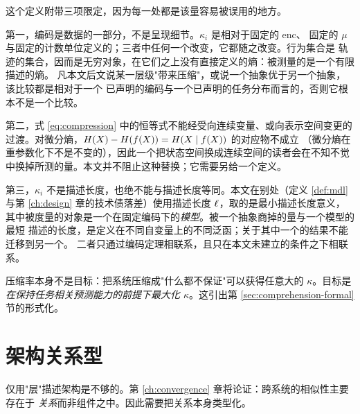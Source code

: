 这个定义附带三项限定，因为每一处都是该量容易被误用的地方。

第一，编码是数据的一部分，不是呈现细节。$\kappa_i$ 是相对于固定的 $\mathrm{enc}$、
固定的 $\mu$ 与固定的计数单位定义的；三者中任何一个改变，它都随之改变。行为集合是
轨迹的集合，因而是无穷对象，在它们之上没有直接定义的熵：被测量的是一个有限描述的熵。
凡本文后文说某一层级"带来压缩"，或说一个抽象优于另一个抽象，该比较都是相对于一个
已声明的编码与一个已声明的任务分布而言的，否则它根本不是一个比较。

第二，式 \eqref{eq:compression} 中的恒等式不能经受向连续变量、或向表示空间变更的
过渡。对微分熵，$H(X)-H(f(X)) = H(X \mid f(X))$ 的对应物不成立
（微分熵在重参数化下不是不变的），因此一个把状态空间换成连续空间的读者会在不知不觉
中换掉所测的量。本文并不阻止这种替换；它需要另给一个定义。

第三，$\kappa_i$ 不是描述长度，也绝不能与描述长度等同。本文在别处（定义 \ref{def:mdl}
与第 \ref{ch:design} 章的技术债落差）使用描述长度 $\ell$，取的是最小描述长度意义，
其中被度量的对象是一个在固定编码下的\emph{模型}。被一个抽象商掉的量与一个模型的最短
描述的长度，是定义在不同自变量上的不同泛函；关于其中一个的结果不能迁移到另一个。
二者只通过编码定理相联系，且只在本文未建立的条件之下相联系。

压缩率本身不是目标：把系统压缩成"什么都不保证"可以获得任意大的 $\kappa$。目标是
\emph{在保持任务相关预测能力的前提下最大化 $\kappa$}。这引出第
\ref{sec:comprehension-formal} 节的形式化。

\section{架构关系型}\label{sec:relations}

仅用"层"描述架构是不够的。第 \ref{ch:convergence} 章将论证：跨系统的相似性主要存在于
\emph{关系}而非组件之中。因此需要把关系本身类型化。

